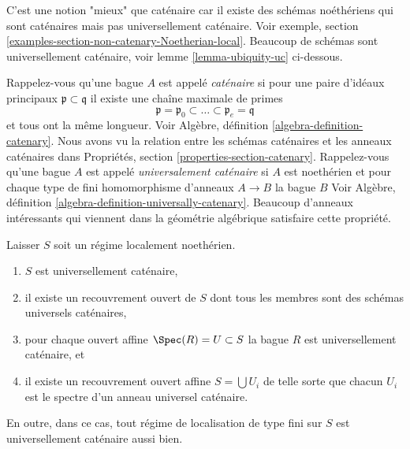 \noindent
C'est une notion "mieux" que caténaire car il existe des schémas noéthériens qui sont caténaires mais pas universellement caténaire. Voir exemple, section \ref{examples-section-non-catenary-Noetherian-local}. Beaucoup de schémas sont universellement caténaire, voir lemme \ref{lemma-ubiquity-uc} ci-dessous.

\medskip\noindent

Rappelez-vous qu'une bague $A$ est appelé {\it caténaire} si pour une paire d'idéaux principaux $\mathfrak p \subset \mathfrak q$
il existe une chaîne maximale de primes
$$
\mathfrak p =
\mathfrak p_0 \subset \ldots \subset \mathfrak p_e
= \mathfrak q
$$
et tous ont la même longueur. Voir Algèbre, définition \ref{algebra-definition-catenary}. Nous avons vu la relation entre les schémas caténaires et les anneaux caténaires dans Propriétés, section \ref{properties-section-catenary}. Rappelez-vous qu'une bague $A$ est appelé {\it universalement caténaire} si
$A$ est noethérien et pour chaque type de fini homomorphisme d'anneaux $A \to B$
la bague $B$ Voir Algèbre, définition \ref{algebra-definition-universally-catenary}. Beaucoup d'anneaux intéressants qui viennent dans la géométrie algébrique satisfaire cette propriété.

\begin{lemma}

\label{lemma-universally-catenary-local}

Laisser $S$ soit un régime localement noethérien.

\begin{enumerate}

\item  $S$ est universellement caténaire,
\item il existe un recouvrement ouvert de $S$ dont tous les membres sont des schémas universels caténaires,
\item pour chaque ouvert affine $\Spec(R) = U \subset S$ la bague
$R$ est universellement caténaire, et
\item il existe un recouvrement ouvert affine $S = \bigcup U_i$ de telle sorte que chacun $U_i$ est le spectre d'un anneau universel caténaire.

\end{enumerate}

En outre, dans ce cas, tout régime de localisation de type fini sur $S$
est universellement caténaire aussi bien.

\end{lemma}


